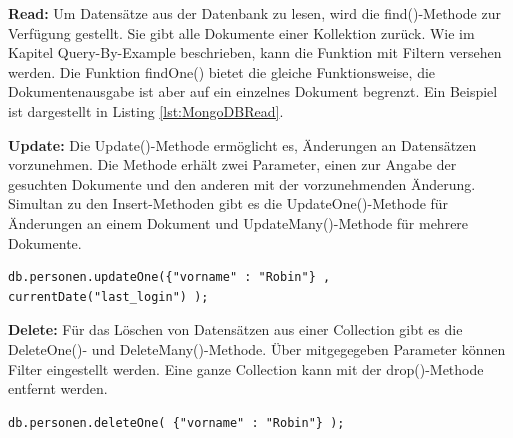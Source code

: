 \noindent
{}
\textbf{Read:}
Um Datensätze aus der Datenbank zu lesen, wird die find()-Methode zur Verfügung gestellt. Sie gibt alle Dokumente einer Kollektion zurück. Wie im Kapitel Query-By-Example beschrieben, kann die Funktion mit Filtern versehen werden. Die Funktion findOne() bietet die gleiche Funktionsweise, die Dokumentenausgabe ist aber auf ein einzelnes Dokument begrenzt. 
Ein Beispiel ist dargestellt in Listing \ref{lst:MongoDBRead}.
\newline\newline

\noindent
{}
\textbf{Update:}
Die Update()-Methode ermöglicht es, Änderungen an Datensätzen vorzunehmen.  Die Methode erhält zwei Parameter, einen zur Angabe der gesuchten Dokumente und den anderen mit  der vorzunehmenden Änderung. Simultan zu den Insert-Methoden gibt es die UpdateOne()-Methode für Änderungen an einem Dokument und UpdateMany()-Methode für mehrere Dokumente.
\newline

\begin{lstlisting}[caption=MongoDB Update, label=lst:MongoDBUpdate]
db.personen.updateOne({"vorname" : "Robin"} , currentDate("last_login") );

\end{lstlisting}

\noindent
{}
\textbf{Delete:}
Für das Löschen von Datensätzen aus einer Collection gibt es die DeleteOne()- und DeleteMany()-Methode. Über mitgegegeben Parameter können Filter eingestellt werden. Eine ganze Collection kann mit der drop()-Methode entfernt werden.
\newline

\begin{lstlisting}[caption=MongoDB Remove, label=lst:MongoDBRemove]
db.personen.deleteOne( {"vorname" : "Robin"} );

\end{lstlisting}

\noindent
